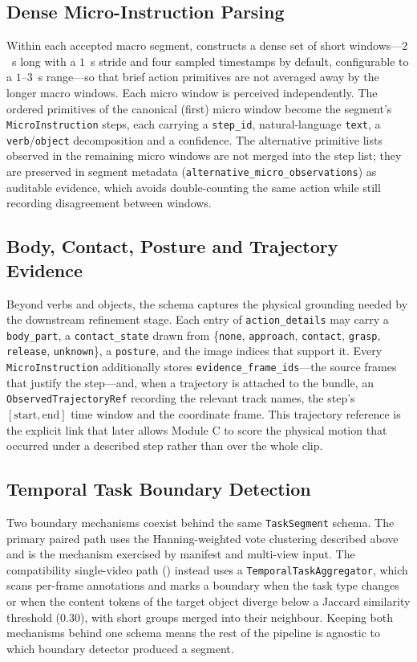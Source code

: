 \documentclass[11pt,oneside]{report}
\begin{document}
\subsection{Dense Micro-Instruction Parsing}
Within each accepted macro segment,  constructs a
dense set of short windows---$2$~s long with a $1$~s stride and four sampled
timestamps by default, configurable to a $1$--$3$~s range---so that brief action
primitives are not averaged away by the longer macro windows. Each micro window
is perceived independently. The ordered primitives of the canonical (first) micro
window become the segment's \texttt{MicroInstruction} steps, each carrying a
\texttt{step\_id}, natural-language \texttt{text}, a \texttt{verb}/\texttt{object}
decomposition and a confidence. The alternative primitive lists observed in the
remaining micro windows are not merged into the step list; they are preserved in
segment metadata (\texttt{alternative\_micro\_observations}) as auditable
evidence, which avoids double-counting the same action while still recording
disagreement between windows.

\subsection{Body, Contact, Posture and Trajectory Evidence}
Beyond verbs and objects, the schema captures the physical grounding needed by
the downstream refinement stage. Each entry of \texttt{action\_details} may carry
a \texttt{body\_part}, a \texttt{contact\_state} drawn from
\{\texttt{none}, \texttt{approach}, \texttt{contact}, \texttt{grasp},
\texttt{release}, \texttt{unknown}\}, a \texttt{posture}, and the image indices
that support it. Every \texttt{MicroInstruction} additionally stores
\texttt{evidence\_frame\_ids}---the source frames that justify the step---and,
when a trajectory is attached to the bundle, an \texttt{ObservedTrajectoryRef}
recording the relevant track names, the step's $[\text{start},\text{end}]$ time
window and the coordinate frame. This trajectory reference is the explicit link
that later allows Module C to score the physical motion that occurred under a
described step rather than over the whole clip.

\subsection{Temporal Task Boundary Detection}
Two boundary mechanisms coexist behind the same \texttt{TaskSegment} schema. The
primary paired path uses the Hanning-weighted vote clustering described above and
is the mechanism exercised by manifest and multi-view input. The compatibility
single-video path () instead uses a
\texttt{TemporalTaskAggregator}, which scans per-frame annotations and marks a
boundary when the task type changes or when the content tokens of the target
object diverge below a Jaccard similarity threshold ($0.30$), with short groups
merged into their neighbour. Keeping both mechanisms behind one schema means the
rest of the pipeline is agnostic to which boundary detector produced a segment.
\end{document}
